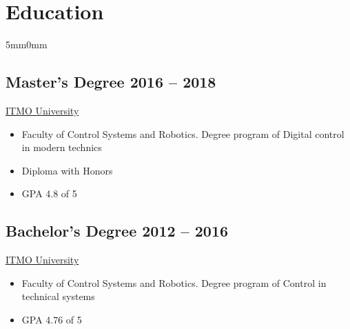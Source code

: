 \documentclass[10pt]{article}
\newcommand{\lmvalue}{5mm}
\newcommand{\rmvalue}{0mm}
\begin{document}
    \section*{Education}
    \begin{changemargin}{\lmvalue}{\rmvalue}
        \subsection*{Master's Degree \hfill {\color{gray}2016 – 2018}}
        \href{https://en.itmo.ru/}{ITMO University}
        \begin{itemize}
            \item Faculty of Control Systems and Robotics.
            Degree program of Digital control in modern technics
            \item Diploma with Honors
            \item GPA 4.8 of 5
        \end{itemize}

        \subsection*{Bachelor's Degree \hfill {\color{gray}2012 – 2016}}
        \href{https://en.itmo.ru/}{ITMO University}
        \begin{itemize}
            \item Faculty of Control Systems and Robotics.
            Degree program of Control in technical systems
            \item GPA 4.76 of 5
        \end{itemize}
    \end{changemargin}
\end{document}
